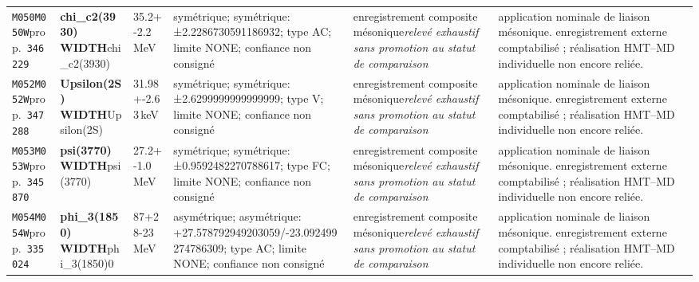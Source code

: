 \begin{landscape}
\begin{longtable}{L{1.85cm}L{4.45cm}L{2.35cm}L{4.05cm}L{3.35cm}L{7.15cm}}
\texttt{M050}\newline \texttt{M050W}\newline prop.\ \texttt{346229} & \textbf{chi\_\allowbreak{}c2(3930) WIDTH}\newline chi\_\allowbreak{}c2(3930) & 35.2+-2.2\,MeV & symétrique; symétrique: ±2.2286730591186932; type AC; limite NONE; confiance non consigné & enregistrement composite mésonique\newline \emph{relevé exhaustif sans promotion au statut de comparaison} & application nominale de liaison mésonique. enregistrement externe comptabilisé ; réalisation HMT--MD individuelle non encore reliée. \\
\texttt{M052}\newline \texttt{M052W}\newline prop.\ \texttt{347288} & \textbf{Upsilon(2S) WIDTH}\newline Upsilon(2S) & 31.98+-2.63\,keV & symétrique; symétrique: ±2.6299999999999999; type V; limite NONE; confiance non consigné & enregistrement composite mésonique\newline \emph{relevé exhaustif sans promotion au statut de comparaison} & application nominale de liaison mésonique. enregistrement externe comptabilisé ; réalisation HMT--MD individuelle non encore reliée. \\
\texttt{M053}\newline \texttt{M053W}\newline prop.\ \texttt{345870} & \textbf{psi(3770) WIDTH}\newline psi(3770) & 27.2+-1.0\,MeV & symétrique; symétrique: ±0.9592482270788617; type FC; limite NONE; confiance non consigné & enregistrement composite mésonique\newline \emph{relevé exhaustif sans promotion au statut de comparaison} & application nominale de liaison mésonique. enregistrement externe comptabilisé ; réalisation HMT--MD individuelle non encore reliée. \\
\texttt{M054}\newline \texttt{M054W}\newline prop.\ \texttt{335024} & \textbf{phi\_\allowbreak{}3(1850) WIDTH}\newline phi\_\allowbreak{}3(1850)0 & 87+28-23\,MeV & asymétrique; asymétrique: +27.578792949203059/-23.092499274786309; type AC; limite NONE; confiance non consigné & enregistrement composite mésonique\newline \emph{relevé exhaustif sans promotion au statut de comparaison} & application nominale de liaison mésonique. enregistrement externe comptabilisé ; réalisation HMT--MD individuelle non encore reliée. \\

\end{longtable}
\end{landscape}
